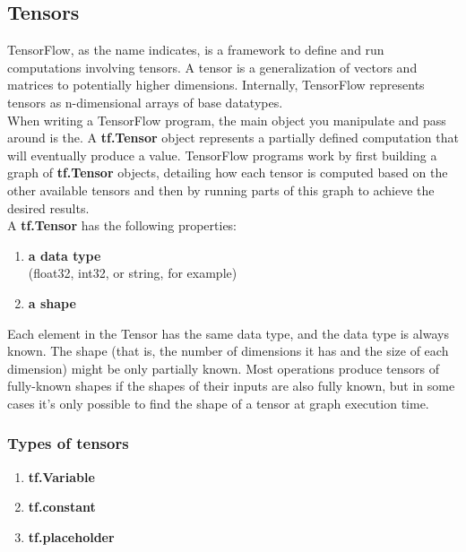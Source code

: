     \subsection{Tensors}
    TensorFlow, as the name indicates, is a framework to define and run computations involving tensors. A tensor is a generalization of vectors and matrices to potentially higher dimensions. Internally, TensorFlow represents tensors as n-dimensional arrays of base datatypes.\\
    When writing a TensorFlow program, the main object you manipulate and pass around is the. A \textbf{tf.Tensor} object represents a partially defined computation that will eventually produce a value. TensorFlow programs work by first building a graph of \textbf{tf.Tensor} objects, detailing how each tensor is computed based on the other available tensors and then by running parts of this graph to achieve the desired results.\cite{web022}\\
    A \textbf{tf.Tensor} has the following properties:
    \begin{enumerate}
      \item\textbf{a data type}\\ 
      (float32, int32, or string, for example)
      \item\textbf{a shape}
      \end{enumerate}
      Each element in the Tensor has the same data type, and the data type is always known. The shape (that is, the number of dimensions it has and the size of each dimension) might be only partially known. Most operations produce tensors of fully-known shapes if the shapes of their inputs are also fully known, but in some cases it's only possible to find the shape of a tensor at graph execution time.
    \subsubsection{Types of tensors}
      \begin{enumerate}
    \item\textbf{tf.Variable}
    \item\textbf{tf.constant}
    \item\textbf{tf.placeholder}
    \end{enumerate}
